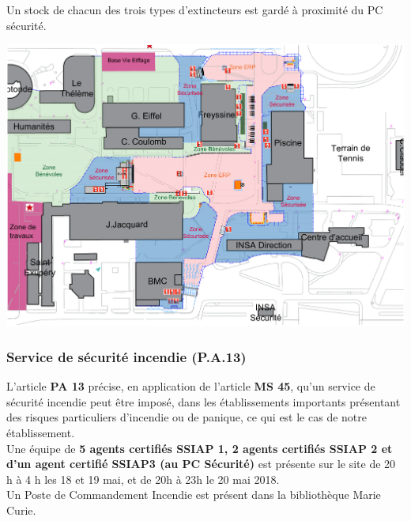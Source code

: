 \documentclass[hidelinks, paper=a4, fontsize=13pt]{report}
\begin{document}
Un stock de chacun des trois types d’extincteurs est gardé à proximité du PC sécurité. 

\begin{center}
	\includegraphics[width=.8\textwidth,keepaspectratio]{Exports/Plan_24h_45eme-Extincteurs}
\end{center}


\subsubsection{Service de sécurité incendie (P.A.13)}
\label{SecuIncendie}

L’article \textbf{PA 13} précise, en application de l’article \textbf{MS 45}, qu’un service de sécurité incendie peut être imposé, dans les établissements importants présentant des risques particuliers d'incendie ou de panique, ce qui est le cas de notre établissement. \\

Une équipe de \textbf{5 agents certifiés SSIAP 1, 2 agents certifiés SSIAP 2 et d’un agent certifié SSIAP3 (au PC Sécurité)} est présente sur le site de 20 h à 4 h les 18 et 19  mai, et de 20h à 23h le 20 mai 2018. \\
Un Poste de Commandement Incendie est présent dans la bibliothèque Marie Curie. \\
\end{document}
